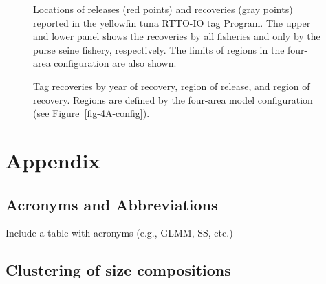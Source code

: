 \documentclass[
]{scrartcl}
\begin{document}
\newpage{}

\begin{figure}


\caption{\label{fig-tag-map}Locations of releases (red points) and
recoveries (gray points) reported in the yellowfin tuna RTTO-IO tag
Program. The upper and lower panel shows the recoveries by all fisheries
and only by the purse seine fishery, respectively. The limits of regions
in the four-area configuration are also shown.}

\end{figure}%

\newpage{}

\begin{figure}


\caption{\label{fig-tag-rec-area}Tag recoveries by year of recovery,
region of release, and region of recovery. Regions are defined by the
four-area model configuration (see Figure~\ref{fig-4A-config}).}

\end{figure}%

\newpage{}

\section{Appendix}\label{appendix}

\subsection{Acronyms and
Abbreviations}\label{acronyms-and-abbreviations}

Include a table with acronyms (e.g., GLMM, SS, etc.)

\newpage{}

\subsection{Clustering of size
compositions}\label{clustering-of-size-compositions}
\end{document}
